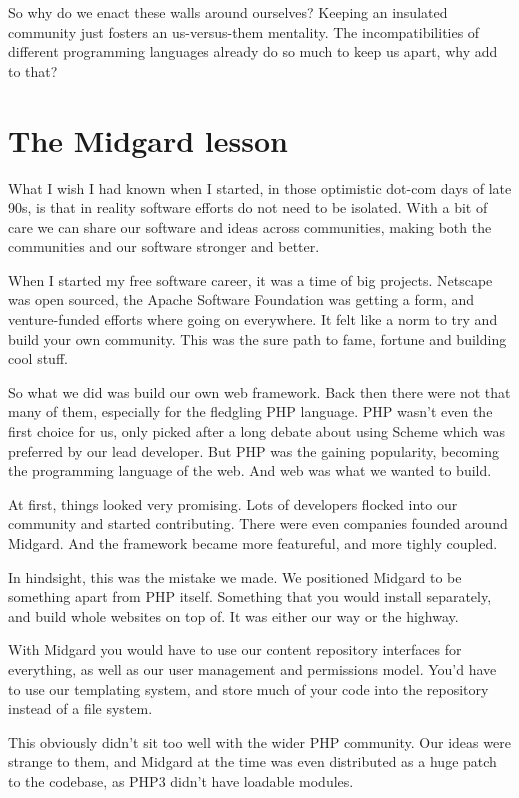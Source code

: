 So why do we enact these walls around ourselves? Keeping an insulated community just fosters an us-versus-them mentality. The incompatibilities of different programming languages already do so much to keep us apart, why add to that? 

\section*{The Midgard lesson}

What I wish I had known when I started, in those optimistic dot-com days of late 90s, is that in reality software efforts do not need to be isolated. With a bit of care we can share our software and ideas across communities, making both the communities and our software stronger and better.

When I started my free software career, it was a time of big projects. Netscape was open sourced, the Apache Software Foundation was getting a form, and venture-funded efforts where going on everywhere. It felt like a norm to try and build your own community. This was the sure path to fame, fortune and building cool stuff.

So what we did was build our own web framework. Back then there were not that many of them, especially for the fledgling PHP language. PHP wasn’t even the first choice for us, only picked after a long debate about using Scheme which was preferred by our lead developer. But PHP was the gaining popularity, becoming the programming language of the web. And web was what we wanted to build.

At first, things looked very promising. Lots of developers flocked into our community and started contributing. There were even companies founded around Midgard. And the framework became more featureful, and more tighly coupled.

In hindsight, this was the mistake we made. We positioned Midgard to be something apart from PHP itself. Something that you would install separately, and build whole websites on top of. It was either our way or the highway.

With Midgard you would have to use our content repository interfaces for everything, as well as our user management and permissions model. You’d have to use our templating system, and store much of your code into the repository instead of a file system.

This obviously didn’t sit too well with the wider PHP community. Our ideas were strange to them, and Midgard at the time was even distributed as a huge patch to the codebase, as PHP3 didn’t have loadable modules.

